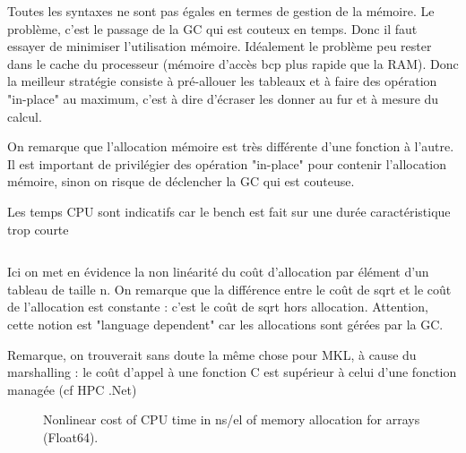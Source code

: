 Toutes les syntaxes ne sont pas égales en termes de gestion de la mémoire.
Le problème, c'est le passage de la GC qui est couteux en temps. Donc il faut essayer de minimiser l'utilisation mémoire. Idéalement le problème peu rester dans le cache du processeur (mémoire d'accès bcp plus rapide que la RAM). Donc la meilleur stratégie consiste à pré-allouer les tableaux et à faire des opération "in-place" au maximum, c'est à dire d'écraser les donner au fur et à mesure du calcul.

On remarque que l'allocation mémoire est très différente d'une fonction à l'autre. Il est important de privilégier des opération "in-place" pour contenir l'allocation mémoire, sinon on risque de déclencher la GC qui est couteuse.

Les temps CPU sont indicatifs car le bench est fait sur une durée caractéristique trop courte

\newpage

\inputminted[linenos,breaklines]{julia}{ap2_bench/bench/sqrt_allocationimpact_code.jl}


Ici on met en évidence la non linéarité du coût d'allocation par élément d'un tableau de taille n.
On remarque que la différence entre le coût de sqrt et le coût de l'allocation est constante : c'est le coût de sqrt 
hors allocation. Attention, cette notion est "language dependent" car les allocations sont gérées par la GC.

Remarque, on trouverait sans doute la même chose pour MKL, à cause du marshalling : le coût d'appel à une fonction C est supérieur à celui d'une fonction managée (cf HPC .Net)

\begin{figure}[h]
\begin{center}
\end{center}
\caption{Nonlinear cost of CPU time in ns/el of memory allocation for arrays (Float64).}
\end{figure}



